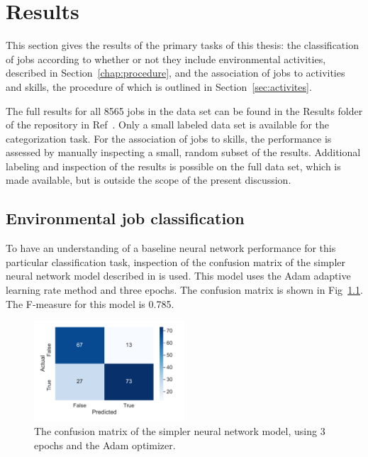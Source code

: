 \chapter{Results}

This section gives the results of the primary tasks of this thesis: the classification of jobs according to whether or not they include environmental activities, described in Section~\ref{chap:procedure}, and the association of jobs to activities and skills, the procedure of which is outlined in Section~\ref{sec:activites}.

The full results for all 8565 jobs in the data set can be found in the Results folder of the repository in Ref~\cite{emilysharata}. Only a small labeled data set is available for the categorization task. For the association of jobs to skills, the performance is assessed by manually inspecting a small, random subset of the results. Additional labeling and inspection of the results is possible on the full data set, which is made available, but is outside the scope of the present discussion.
\label{chap:Results}
\section{Environmental job classification}
\label{sec:greenresults}

To have an understanding of a baseline neural network performance for this particular classification task, inspection of the confusion matrix of the simpler neural network model described in  is used. This model uses the Adam adaptive learning rate method and three epochs. The confusion matrix is shown in Fig~\ref{fig:simpleModelConfusion}. The F-measure for this model is 0.785.


\begin{figure}[htbp]
  \centering
    \includegraphics[width=0.5\textwidth]{figures/simpleModelConfusion.pdf}
    \caption{
    	The confusion matrix of the simpler neural network model, using 3 epochs and the Adam optimizer. 
    	}
\label{fig:simpleModelConfusion}
\end{figure}

